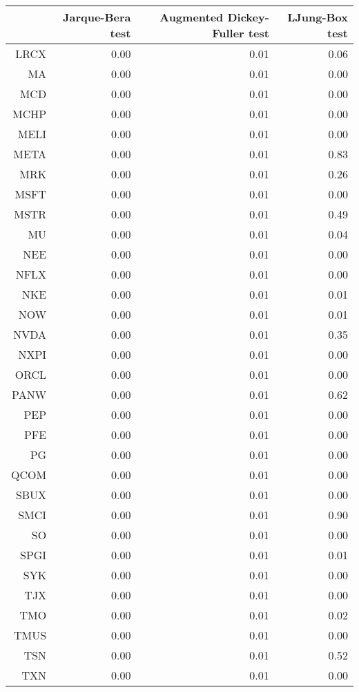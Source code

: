 \begin{table}[ht]
\centering
\begin{tabular}{rrrr}
  \hline
 & Jarque-Bera test & Augmented Dickey-Fuller test & LJung-Box test \\ 
  \hline
LRCX & 0.00 & 0.01 & 0.06 \\ 
  MA & 0.00 & 0.01 & 0.00 \\ 
  MCD & 0.00 & 0.01 & 0.00 \\ 
  MCHP & 0.00 & 0.01 & 0.00 \\ 
  MELI & 0.00 & 0.01 & 0.00 \\ 
  META & 0.00 & 0.01 & 0.83 \\ 
  MRK & 0.00 & 0.01 & 0.26 \\ 
  MSFT & 0.00 & 0.01 & 0.00 \\ 
  MSTR & 0.00 & 0.01 & 0.49 \\ 
  MU & 0.00 & 0.01 & 0.04 \\ 
  NEE & 0.00 & 0.01 & 0.00 \\ 
  NFLX & 0.00 & 0.01 & 0.00 \\ 
  NKE & 0.00 & 0.01 & 0.01 \\ 
  NOW & 0.00 & 0.01 & 0.01 \\ 
  NVDA & 0.00 & 0.01 & 0.35 \\ 
  NXPI & 0.00 & 0.01 & 0.00 \\ 
  ORCL & 0.00 & 0.01 & 0.00 \\ 
  PANW & 0.00 & 0.01 & 0.62 \\ 
  PEP & 0.00 & 0.01 & 0.00 \\ 
  PFE & 0.00 & 0.01 & 0.00 \\ 
  PG & 0.00 & 0.01 & 0.00 \\ 
  QCOM & 0.00 & 0.01 & 0.00 \\ 
  SBUX & 0.00 & 0.01 & 0.00 \\ 
  SMCI & 0.00 & 0.01 & 0.90 \\ 
  SO & 0.00 & 0.01 & 0.00 \\ 
  SPGI & 0.00 & 0.01 & 0.01 \\ 
  SYK & 0.00 & 0.01 & 0.00 \\ 
  TJX & 0.00 & 0.01 & 0.00 \\ 
  TMO & 0.00 & 0.01 & 0.02 \\ 
  TMUS & 0.00 & 0.01 & 0.00 \\ 
  TSN & 0.00 & 0.01 & 0.52 \\ 
  TXN & 0.00 & 0.01 & 0.00 \\ 

\end{tabular}
\end{table}

